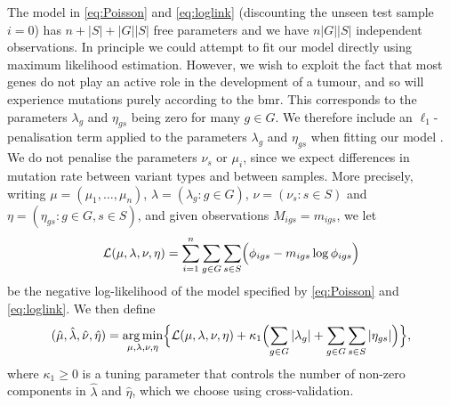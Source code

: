 \documentclass[12pt]{article}
\DeclareMathOperator*{\argmin}{arg\,min}
\begin{document}
The model in \eqref{eq:Poisson} and \eqref{eq:loglink} (discounting the unseen test sample $i=0$) has $n + |S| + |G||S|$ free parameters and we have $n|G||S|$ independent observations. In principle we could attempt to fit our model directly using maximum likelihood estimation. However, we wish to exploit the fact that most genes do not play an active role in the development of a tumour, and so will experience mutations purely according to the \acrshort{bmr}. This corresponds to the parameters $\lambda_g$ and $\eta_{gs}$ being zero for many $g \in G$. We therefore include an $\ell_1$-penalisation term applied to the parameters $\lambda_g$ and $\eta_{gs}$ when fitting our model \citep{van_de_geer_high-dimensional_2008}. We do not penalise the parameters $\nu_s$ or $\mu_i$, since we expect differences in mutation rate between variant types and between samples. More precisely, writing $\mu = (\mu_1,\ldots, \mu_n)$, $\lambda = (\lambda_g :g \in G)$, $\nu = (\nu_s: s \in S)$ and $\eta = (\eta_{gs}: g\in G, s\in S)$, and given observations $M_{igs} = m_{igs}$, we let
\[
\mathcal{L}(\mu, \lambda, \nu, \eta) = \sum_{i = 1}^n \sum_{g \in G} \sum_{s \in S} \Bigl( \phi_{igs} - m_{igs} \log \phi_{igs} \Bigr) 
\]
be the negative log-likelihood of the model specified by \eqref{eq:Poisson} and \eqref{eq:loglink}. We then define
\begin{equation}
(\hat{\mu}, \hat{\lambda}, \hat{\nu}, \hat{\eta}) = \argmin_{\mu,\lambda, \nu, \eta} \Bigl\{ \mathcal{L}(\mu, \lambda, \nu, \eta) + \kappa_1 \Bigl(\sum_{g \in G} |\lambda_g|  +  \sum_{g \in G} \sum_{s \in S} |\eta_{gs}| \Bigr) \Bigr\},
\label{eq:genparams}
\end{equation}
where $\kappa_1 \geq 0$ is a tuning parameter that controls the number of non-zero components in $\hat{\lambda}$ and $\hat{\eta}$, which we choose using cross-validation. 
\end{document}
